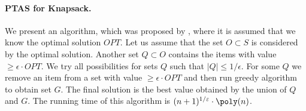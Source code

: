 \paragraph{PTAS for Knapsack.}
We present an algorithm, which was proposed by \cite{lawler1979fast}, where it is assumed that we know the optimal solution $OPT$.
Let us assume that the set $O \subset S$ is considered by the optimal solution.
Another set $Q \subset O$ contains the items with value $\ge \epsilon \cdot OPT$.
We try all possibilities for sets $Q$ such that $|Q| \le 1/\epsilon$.
For some $Q$ we remove an item from a set with value $\ge \epsilon \cdot OPT$ and then run greedy algorithm to obtain set $G$.
The final solution is the best value obtained by the union of $Q$ and $G$.
The running time of this algorithm is $(n+1)^{1/\epsilon} \cdot \poly(n)$.

